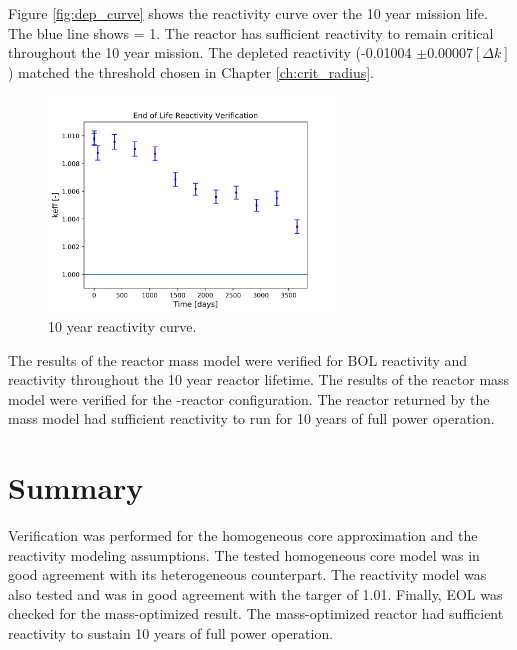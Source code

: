Figure \ref{fig:dep_curve} shows the reactivity curve over the 10 year mission
life. The blue line shows \keff = 1. The reactor has sufficient reactivity to
remain critical throughout the 10 year mission. The depleted reactivity
(-0.01004 $\pm 0.00007 [\Delta k]$) matched the threshold chosen in 
Chapter \ref{ch:crit_radius}. 

\begin{figure}[h]
    \centering
    \includegraphics[width=3in]{../images/depletion_results.png}
\caption{10 year reactivity curve.}
\label{fig:depl_curve}
\end{figure}

The results of the reactor mass model were verified for BOL reactivity and
reactivity throughout the 10 year reactor lifetime. The results of the reactor
mass model were verified for the \uox-\codiox reactor configuration. The reactor
returned by the mass model had sufficient reactivity to run for 10 years of full
power operation.

\section{Summary}
Verification was performed for the homogeneous core approximation and the
reactivity modeling assumptions. The tested homogeneous core model was in good
agreement with its heterogeneous counterpart. The reactivity model was also
tested and was in good agreement with the targer \keff of 1.01. Finally, EOL
\keff was checked for the mass-optimized result. The mass-optimized reactor had
sufficient reactivity to sustain 10 years of full power operation.
